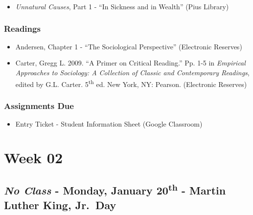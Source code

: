 \documentclass[]{book}
\providecommand{\tightlist}{%
  \setlength{\itemsep}{0pt}\setlength{\parskip}{0pt}}
\begin{document}
\begin{itemize}
\tightlist
\item
  \emph{Unnatural Causes}, Part 1 - ``In Sickness and in Wealth'' (Pius Library)
\end{itemize}

\hypertarget{readings-1}{%
\subsubsection*{Readings}\label{readings-1}}

\begin{itemize}
\tightlist
\item
  Andersen, Chapter 1 - ``The Sociological Perspective'' (Electronic Reserves)
\item
  Carter, Gregg L. 2009. ``A Primer on Critical Reading.'' Pp. 1-5 in \emph{Empirical Approaches to Sociology: A Collection of Classic and Contemporary Readings}, edited by G.L. Carter. 5\textsuperscript{th} ed. New York, NY: Pearson. (Electronic Reserves)
\end{itemize}

\hypertarget{assignments-due}{%
\subsubsection*{Assignments Due}\label{assignments-due}}

\begin{itemize}
\tightlist
\item
  Entry Ticket - Student Information Sheet (Google Classroom)
\end{itemize}

\newpage

\hypertarget{week-02}{%
\section*{Week 02}\label{week-02}}

\hypertarget{no-class---monday-january-20th---martin-luther-king-jr.day}{%
\subsection*{\texorpdfstring{\emph{No Class} - Monday, January 20\textsuperscript{th} - Martin Luther King, Jr.~Day}{No Class - Monday, January 20th - Martin Luther King, Jr.~Day}}\label{no-class---monday-january-20th---martin-luther-king-jr.day}}
\end{document}
